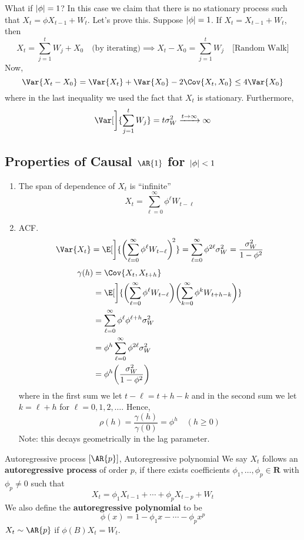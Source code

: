 What if $ \lvert\phi\rvert=1 $? In this case we claim that
there is no stationary process such that $ X_t=\phi X_{t-1}+W_t $. Let's prove this.
Suppose $ \lvert\phi\rvert=1 $. If $ X_t=X_{t-1}+W_{t} $, then
\[ X_t=\sum_{j=1}^{t} W_j+X_0\quad\text{(by iterating)}
    \implies X_t-X_0=\sum_{j=1}^{t} W_j\quad\text{[Random Walk]} \]
Now,
\[ \Var{X_t-X_0}=\Var{X_t}+\Var{X_0}-2\Cov{X_t,X_0}\le 4\Var{X_0} \]
where in the last inequality we used the fact that $ X_t $ is stationary.
Furthermore,
\[ \Var[\bigg]{\sum_{j=1}^{t} W_j}=t\sigma_W^2\xrightarrow{t\to\infty}\infty \]
\subsection*{Properties of Causal $ \AR{1} $ for $ \lvert\phi\rvert<1 $}
\begin{enumerate}[(1)]
    \item The span of dependence of $ X_t $ is ``infinite''
          \[ X_t=\sum_{\ell=0}^{\infty} \phi^\ell W_{t-\ell} \]
    \item ACF.\@
          \[ \Var{X_t}=\E[\bigg]{\biggl(\sum_{\ell=0}^{\infty}\phi^\ell W_{t-\ell} \biggr)^{\!2}}
              =\sum_{\ell=0}^{\infty} \phi^{2\ell}\sigma_W^2=\frac{\sigma_W^2}{1-\phi^2}  \]
          \begin{align*}
              \gamma(h)
               & =\Cov{X_t,X_{t+h}}                                                                                                      \\
               & =\E[\bigg]{\biggl(\sum_{\ell=0}^{\infty} \phi^\ell W_{t-\ell}\biggr)\biggl(\sum_{k=0}^{\infty} \phi^k W_{t+h-k}\biggr)} \\
               & =\sum_{\ell=0}^{\infty} \phi^\ell \phi^{\ell+h}\sigma_W^2                                                               \\
               & =\phi^h \sum_{\ell=0}^{\infty} \phi^{2\ell}\sigma_W^2                                                                   \\
               & =\phi^h \biggl(\frac{\sigma_W^2}{1-\phi^2} \biggr)
          \end{align*}
          where in the first sum we let $ t-\ell=t+h-k $ and in the second sum
          we let $ k=\ell+h $ for $ \ell=0,1,2,\ldots $. Hence,
          \[ \rho(h)=\frac{\gamma(h)}{\gamma(0)} =\phi^h\quad(h\ge 0) \]
          Note: this decays geometrically in the lag parameter.
\end{enumerate}
\begin{Definition}{Autoregressive process $ [\AR{p}] $, Autoregressive polynomial}{}
    We say $ X_t $ follows an \textbf{autoregressive process} of order $ p $,
    if there exists coefficients $ \phi_1,\ldots,\phi_p\in\mathbf{R} $
    with $ \phi_p\ne 0 $ such that
    \[ X_t=\phi_1X_{t-1}+\cdots+\phi_p X_{t-p}+W_t \]
    We also define the \textbf{autoregressive polynomial} to be
    \[ \phi(x)=1-\phi_1 x-\cdots-\phi_p x^p \]
    $ X_t\sim \AR{p} $ if $ \phi(B)X_t=W_t $.
\end{Definition}
